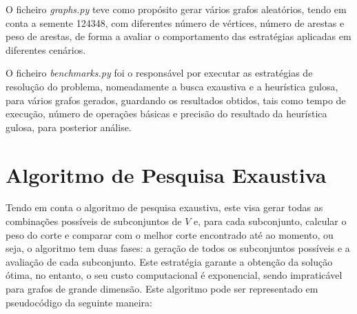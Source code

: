 \documentclass[mirror]{revdetua}
\begin{document}
O ficheiro \textit{graphs.py} teve como propósito gerar vários grafos aleatórios, tendo em conta a semente 124348, com diferentes número de vértices, número de arestas e peso de arestas, de forma a avaliar o comportamento das estratégias aplicadas em diferentes cenários.

O ficheiro \textit{benchmarks.py} foi o responsável por executar as estratégias de resolução do problema, nomeadamente a busca exaustiva e a heurística gulosa, para vários grafos gerados, guardando os resultados obtidos, tais como tempo de execução, número de operações básicas e precisão do resultado da heurística gulosa, para posterior análise.


\section{Algoritmo de Pesquisa Exaustiva}

Tendo em conta o algoritmo de pesquisa exaustiva, este visa gerar todas as combinações possíveis de subconjuntos de $V$ e, para cada subconjunto, calcular o peso do corte e comparar com o melhor corte encontrado até ao momento, ou seja, o algoritmo tem duas fases: a geração de todos os subconjuntos possíveis e a avaliação de cada subconjunto. Este estratégia garante a obtenção da solução ótima, no entanto, o seu custo computacional é exponencial, sendo impraticável para grafos de grande dimensão. Este algoritmo pode ser representado em pseudocódigo da seguinte maneira:
\end{document}
